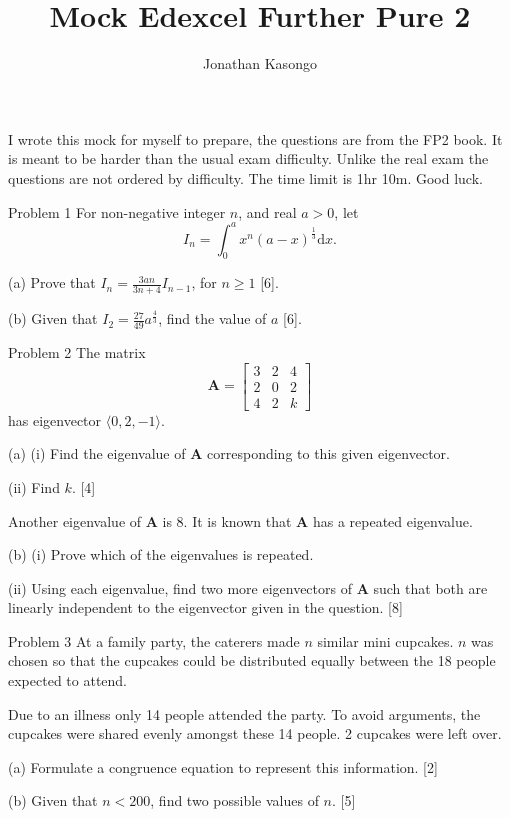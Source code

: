 \documentclass{article}
\author{Jonathan Kasongo}
\title{Mock Edexcel Further Pure 2}
\begin{document}
\maketitle

I wrote this mock for myself to prepare, the questions are from the
FP2 book. It is meant to be harder than the usual exam difficulty.
Unlike the real exam the questions are not ordered by difficulty.
The time limit is 1hr 10m. Good luck.

\begin{problem}{Problem 1}
For non-negative integer $n$, and real $a>0$, let
$$I_n = \int_0^a x^n (a-x)^\frac13 \text{d}x.$$
\vspace{0.2cm}

(a) Prove that $I_n = \frac{3an}{3n+4}I_{n-1}$, for $n\geq 1$ [6].
\vspace{0.2cm}

(b) Given that $I_2 = \frac{27}{49} a^\frac43$, find the value of $a$ [6].
\end{problem}

\begin{problem}{Problem 2}
The matrix
$$
\mathbf{A} = \begin{bmatrix}
3 & 2 & 4 \\
2 & 0 & 2 \\
4 & 2 & k
\end{bmatrix}
$$
has eigenvector $\langle 0, 2, -1 \rangle$.
\vspace{0.2cm}

(a) (i) Find the eigenvalue of $\mathbf{A}$ corresponding to this given
eigenvector. \vspace{0.2cm}

(ii) Find $k$. [4] \vspace{0.2cm}

Another eigenvalue of $\mathbf{A}$ is 8.
It is known that $\mathbf{A}$ has a repeated eigenvalue.
\vspace{0.2cm}

(b) (i) Prove which of the eigenvalues is repeated.
\vspace{0.2cm}

(ii) Using each eigenvalue, find two more eigenvectors of $\mathbf{A}$ such
that both are linearly independent to the eigenvector given in the question.
[8]
\end{problem}

\begin{problem}{Problem 3}
At a family party, the caterers made $n$ similar mini cupcakes.
$n$ was chosen so that the cupcakes could be distributed equally between
the 18 people expected to attend. \vspace{0.2cm}

Due to an illness only 14 people attended the party. To avoid arguments,
the cupcakes were shared evenly amongst these 14 people.
2 cupcakes were left over. \vspace{0.2cm}

(a) Formulate a congruence equation to represent this information.
[2] \vspace{0.2cm}

(b) Given that $n<200$, find two possible values of $n$.
[5]
\end{problem}
\end{document}
